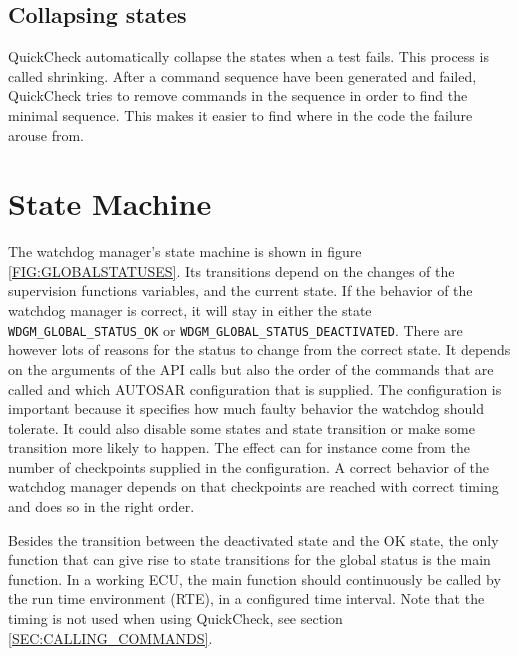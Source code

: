 \subsection{Collapsing states}
QuickCheck automatically collapse the states when a test fails. This
process is called shrinking. After a command sequence have been
generated and failed, QuickCheck tries to remove commands in the
sequence in order to find the minimal sequence. This makes it easier
to find where in the code the failure arouse from.

\section{State Machine}
The watchdog manager's state machine is shown in figure
\ref{FIG:GLOBALSTATUSES}. Its transitions depend on the changes of the
supervision functions variables, and the current state. If the
behavior of the watchdog manager is correct, it will stay in either
the state \lstinline!WDGM_GLOBAL_STATUS_OK! or
\lstinline!WDGM_GLOBAL_STATUS_DEACTIVATED!. There are however lots of
reasons for the status to change from the correct state. It depends on
the arguments of the API calls but also the order of the commands that
are called and which AUTOSAR configuration that is supplied. The
configuration is important because it specifies how much faulty
behavior the watchdog should tolerate. It could also disable some
states and state transition or make some transition more likely to
happen. The effect can for instance come from the number of
checkpoints supplied in the configuration. A correct behavior of the
watchdog manager depends on that checkpoints are reached with correct
timing and does so in the right order.

Besides the transition between the deactivated state and the OK state,
the only function that can give rise to state transitions for the
global status is the main function. In a working ECU, the main
function should continuously be called by the run time environment
(RTE), in a configured time interval. Note that the timing is not used
when using QuickCheck, see section \ref{SEC:CALLING_COMMANDS}.

